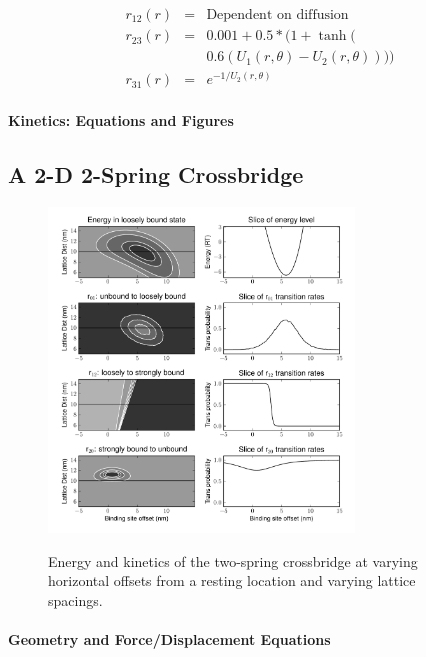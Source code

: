 \documentclass[]{article}
\begin{document}
\begin{eqnarray}  
\label{1sTransRates}
	r_{12}(r)   & = & \text{Dependent on diffusion} \nonumber \\
    r_{23}(r)   & = & 0.001 + 0.5 * (1 + \tanh( \nonumber \\
                        &   & 0.6 (U_1(r, \theta) - U_2(r, \theta)))) \\
	r_{31}(r)   & = & e^{-1 / U_2(r, \theta)}
\end{eqnarray} 
 
\paragraph*{Kinetics: Equations and Figures}




\subsection*{A 2-D 2-Spring Crossbridge}


\begin{figure}[H]
    \begin{center}
    \includegraphics[width=3.2in]{../imgs/xxCG_hybrid.pdf}
    \label{fig:xxCG}
    \caption{{\small 
        Energy and kinetics of the two-spring crossbridge at varying horizontal offsets from a resting location and varying lattice spacings.}}
    \end{center}
\end{figure}

\paragraph*{Geometry and Force/Displacement Equations}
\end{document}
